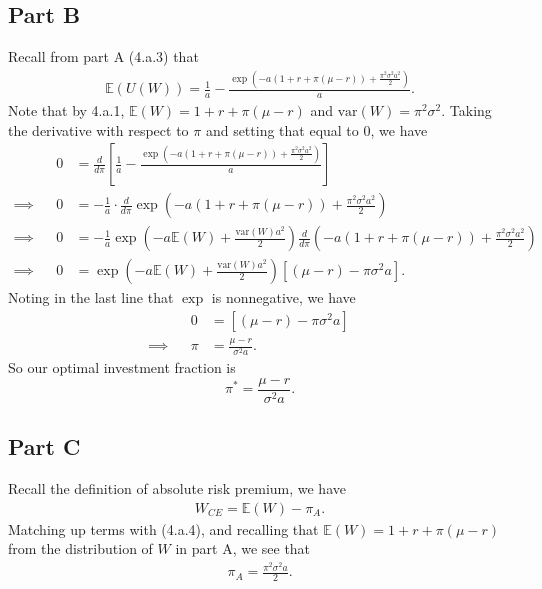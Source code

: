 \documentclass{article}
\begin{document}
\subsection*{Part B}
Recall from part A (4.a.3) that
\begin{align*}
	\mathbb{E}(U(W)) = \frac{1}{a} - \frac{\exp(-a(1 + r + \pi(\mu - r)) + \frac{\pi^2\sigma^2a^2}{2})}{a}.
\end{align*}
Note that by 4.a.1, $\mathbb{E}(W) = 1 + r + \pi(\mu - r)$ and $\text{var}(W) = \pi^2\sigma^2$. Taking the derivative with respect to $\pi$ and setting that equal to 0, we have
\begin{align*}
	& & 0 &=\frac{d}{d\pi}\left[\frac{1}{a} - \frac{\exp(-a(1 + r + \pi(\mu - r)) + \frac{\pi^2\sigma^2a^2}{2})}{a}\right] & &\\
	\implies & & 0 &= -\frac{1}{a}\cdot\frac{d}{d\pi}\exp(-a(1 + r + \pi(\mu - r)) + \frac{\pi^2\sigma^2a^2}{2})\\
	\implies & & 0 &=-\frac{1}{a}\exp\left(-a\mathbb{E}(W) + \frac{\text{var}(W)a^2}{2}\right)\frac{d}{d\pi}\left(-a(1 + r + \pi(\mu - r)) + \frac{\pi^2\sigma^2a^2}{2}\right)\\
	\implies & & 0 &= \exp\left(-a\mathbb{E}(W) + \frac{\text{var}(W)a^2}{2}\right)\left[(\mu - r) - \pi\sigma^2a \right].
\end{align*}
Noting in the last line that $\exp$ is nonnegative, we have
\begin{align*}
	& & 0 &= \left[(\mu - r) - \pi\sigma^2a \right] & &\\
	\implies & & \pi &= \frac{\mu - r}{\sigma^2a}. & &
\end{align*}
So our optimal investment fraction is 
\begin{equation*}
	\displaystyle\pi^* = \frac{\mu - r}{\sigma^2a}.\tag{4.b.1}
\end{equation*}




\subsection*{Part C}
Recall the definition of absolute risk premium, we have
\begin{align*}
	W_{CE} = \mathbb{E}(W) - \pi_A.
\end{align*}
Matching up terms with (4.a.4), and recalling that $\mathbb{E}(W) = 1 + r + \pi(\mu - r)$ from the distribution of $W$ in part A, we see that
\begin{align*}
	\pi_A = \frac{\pi^2\sigma^2a}{2}.
\end{align*}
\end{document}

